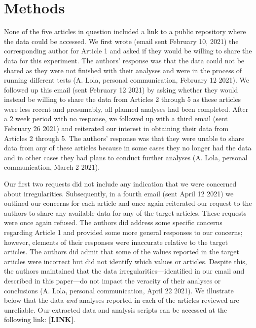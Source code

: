 \documentclass[
  english,
  man,floatsintext]{apa7}
\begin{document}
\hypertarget{methods}{%
\section{Methods}\label{methods}}

None of the five articles in question included a link to a public repository where the data could be accessed. We first wrote (email sent February 10, 2021) the corresponding author for Article 1 and asked if they would be willing to share the data for this experiment. The authors' response was that the data could not be shared as they were not finished with their analyses and were in the process of running different tests (A. Lola, personal communication, February 12 2021). We followed up this email (sent February 12 2021) by asking whether they would instead be willing to share the data from Articles 2 through 5 as these articles were less recent and presumably, all planned analyses had been completed. After a 2 week period with no response, we followed up with a third email (sent February 26 2021) and reiterated our interest in obtaining their data from Articles 2 through 5. The authors' response was that they were unable to share data from any of these articles because in some cases they no longer had the data and in other cases they had plans to conduct further analyses (A. Lola, personal communication, March 2 2021).

Our first two requests did not include any indication that we were concerned about irregularities. Subsequently, in a fourth email (sent April 12 2021) we outlined our concerns for each article and once again reiterated our request to the authors to share any available data for any of the target articles. These requests were once again refused. The authors did address some specific concerns regarding Article 1 and provided some more general responses to our concerns; however, elements of their responses were inaccurate relative to the target articles. The authors did admit that some of the values reported in the target articles were incorrect but did not identify which values or articles. Despite this, the authors maintained that the data irregularities---identified in our email and described in this paper---do not impact the veracity of their analyses or conclusions (A. Lola, personal communication, April 22 2021). We illustrate below that the data \emph{and} analyses reported in each of the articles reviewed are unreliable. Our extracted data and analysis scripts can be accessed at the following link: \textbf{{[}LINK{]}}.
\end{document}
